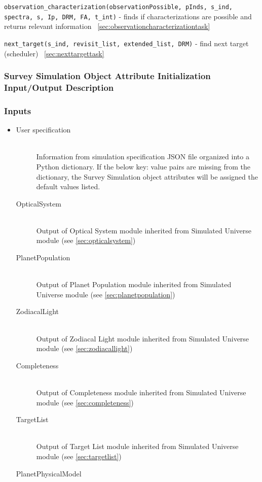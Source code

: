 \documentclass[cleanfoot]{asme2ej}
\begin{document}
\verb+observation_characterization(observationPossible, pInds, s_ind, spectra, s, Ip, DRM, FA, t_int)+ - finds if characterizations are possible and returns relevant information ~\ref{sec:observationcharacterizationtask}

\verb+next_target(s_ind, revisit_list, extended_list, DRM)+ - find next target (scheduler) ~\ref{sec:nexttargettask}

\subsubsection{Survey Simulation Object Attribute Initialization Input/Output Description}
\subsubsection*{Inputs}
\begin{itemize}
    \item 
    \begin{description}
        \item[User specification] \hfill \\
        Information from simulation specification JSON file organized into a Python dictionary. If the below key: value pairs are missing from the dictionary, the Survey Simulation object attributes will be assigned the default values listed.
        \item[OpticalSystem] \hfill \\
        Output of Optical System module inherited from Simulated Universe module (see \ref{sec:opticalsystem})
        \item[PlanetPopulation] \hfill \\
        Output of Planet Population module inherited from Simulated Universe module (see \ref{sec:planetpopulation})
        \item[ZodiacalLight] \hfill \\
        Output of Zodiacal Light module inherited from Simulated Universe module (see \ref{sec:zodiacallight})
        \item[Completeness] \hfill \\
        Output of Completeness module inherited from Simulated Universe module (see \ref{sec:completeness})
        \item[TargetList] \hfill \\
        Output of Target List module inherited from Simulated Universe module (see \ref{sec:targetlist})
        \item[PlanetPhysicalModel] \hfill \\

\end{description}
\end{itemize}
\end{document}
